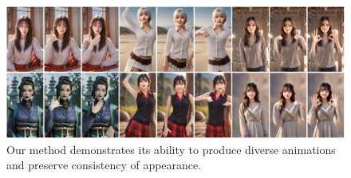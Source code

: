 \begin{figure}[h!]
    \centering
    \includegraphics[width=1.0\columnwidth]{./image/fig1.pdf}
    \vspace{-15pt}
    \caption{Our method demonstrates its ability to produce diverse animations and preserve consistency of appearance.}
    \label{fig:intro}
\end{figure}